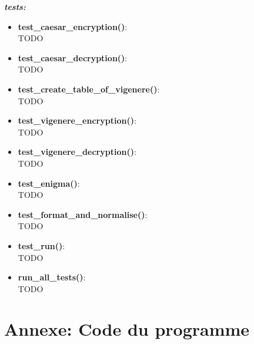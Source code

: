 \documentclass[a4paper,12pt,abstracton,titlepage]{scrartcl}
\begin{document}
\textit{\textbf{tests:}}\vspace{0.2cm}
\begin{itemize}
\item \textbf{test\_caesar\_encryption()}:\\
TODO\\
\item \textbf{test\_caesar\_decryption()}:\\
TODO\\
\item \textbf{test\_create\_table\_of\_vigenere()}:\\
TODO\\
\item \textbf{test\_vigenere\_encryption()}:\\
TODO\\
\item \textbf{test\_vigenere\_decryption()}:\\
TODO\\
\item \textbf{test\_enigma()}:\\
TODO\\
\item \textbf{test\_format\_and\_normalise()}:\\
TODO\\
\item \textbf{test\_run()}:\\
TODO\\
\item \textbf{run\_all\_tests()}:\\
TODO\\
\end{itemize}





\section{Annexe: Code du programme}








\end{document}
